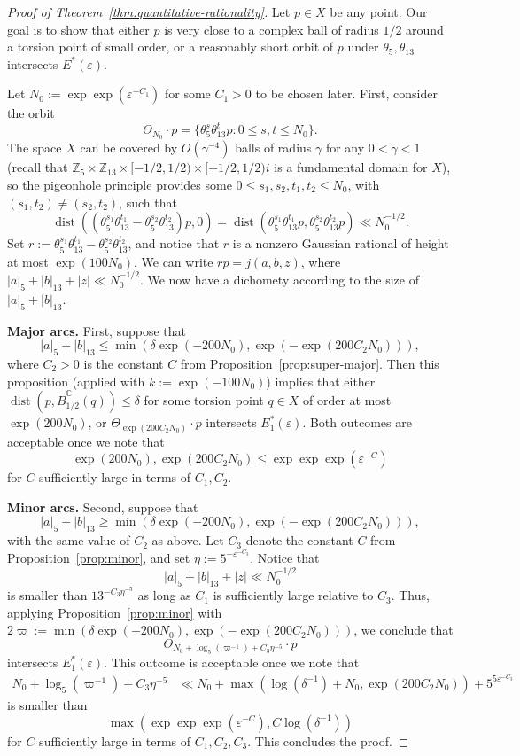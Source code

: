 \documentclass[11pt]{amsart}
\theoremstyle{definition}
\newcommand{\C}{{\mathbb C}}
\newcommand{\Z}{{\mathbb Z}}
\DeclareMathOperator{\dist}{dist}
\begin{document}
\begin{proof}[Proof of Theorem~\ref{thm:quantitative-rationality}]
Let $p \in X$ be any point.  Our goal is to show that either $p$ is very close to a complex ball of radius $1/2$ around a torsion point of small order, or a reasonably short orbit of $p$ under $\theta_5, \theta_{13}$ intersects $E^*(\varepsilon)$.

Let $N_0:=\exp\exp(\varepsilon^{-C_1})$ for some $C_1>0$ to be chosen later. 
 First, consider the orbit
$$\Theta_{N_0} \cdot p=\{\theta_5^s \theta_{13}^t p: 0 \leq s,t \leq N_0\}.$$
The space $X$ can be covered by $O(\gamma^{-4})$ balls of radius $\gamma$ for any $0<\gamma<1$ (recall that $\Z_5 \times \Z_{13} \times [-1/2,1/2) \times [-1/2,1/2)i$ is a fundamental domain for $X$), so the pigeonhole principle provides some $0 \leq s_1,s_2,t_1,t_2 \leq N_0$, with $(s_1,t_2) \neq (s_2,t_2)$, such that $$\dist((\theta_5^{s_1}\theta_{13}^{t_1}-\theta_5^{s_2}\theta_{13}^{t_2})p,0)=\dist(\theta_5^{s_1} \theta_{13}^{t_1}p, \theta_5^{s_2} \theta_{13}^{t_2}p) \ll N_0^{-1/2}.$$
Set $r:=\theta_5^{s_1}\theta_{13}^{t_1}-\theta_5^{s_2}\theta_{13}^{t_2}$, and notice that $r$ is a nonzero Gaussian rational of height at most $\exp(100N_0)$. We can write $rp=j(a,b,z)$, where $|a|_5+|b|_{13}+|z| \ll N_0^{-1/2}$.  We now have a dichomety according to the size of $|a|_5+|b|_{13}$.   %

{\bf Major arcs.}  First, suppose that $$|a|_5+|b|_{13} \leq \min(\delta \exp(-200 N_0), \exp(-\exp(200C_2N_0))),$$ where $C_2>0$ is the constant $C$ from Proposition~\ref{prop:super-major}.  Then this proposition (applied with $k:=\exp(-100N_0)$) implies that either $\dist(p, \overline{B}_{1/2}^{\C}(q)) \leq \delta$ for some torsion point $q \in X$ of order at most $\exp(200N_0)$, or $\Theta_{\exp(200C_2 N_0)} \cdot p$ intersects $E^*_1(\varepsilon)$.  Both outcomes are acceptable once we note that
$$\exp(200N_0),\exp(200C_2N_0) \leq \exp\exp \exp(\varepsilon^{-C})$$
for $C$ sufficiently large in terms of $C_1,C_2$.

{\bf Minor arcs.}  Second, suppose that
$$|a|_5+|b|_{13} \geq \min(\delta \exp(-200 N_0), \exp(-\exp(200C_2N_0))),$$
with the same value of $C_2$ as above.  Let $C_3$ denote the constant $C$ from Proposition~\ref{prop:minor}, and set $\eta:=5^{-\varepsilon^{-C_3}}$.  Notice that
$$|a|_5+|b|_{13}+|z| \ll N_0^{-1/2}$$
is smaller than $13^{-C_3 \eta^{-5}}$ as long as $C_1$ is sufficiently large relative to $C_3$.  Thus, applying Proposition~\ref{prop:minor} with $2\varpi:=\min(\delta \exp(-200 N_0), \exp(-\exp(200C_2N_0)))$, we conclude that
$$\Theta_{N_0+\log_5(\varpi^{-1})+C_3 \eta^{-5}} \cdot p$$
intersects $E^*_1(\varepsilon)$.  This outcome is acceptable once we note that
\begin{align*}
N_0+\log_5(\varpi^{-1})+C_3 \eta^{-5} &\ll N_0+\max(\log(\delta^{-1})+N_0,\exp(200 C_2 N_0))+5^{5\varepsilon^{-C_3}}
\end{align*}
is smaller than $$\max(\exp\exp\exp(\varepsilon^{-C}), C\log(\delta^{-1}))$$
for $C$ sufficiently large in terms of $C_1,C_2,C_3$.  This concludes the proof.
\end{proof}
\end{document}
